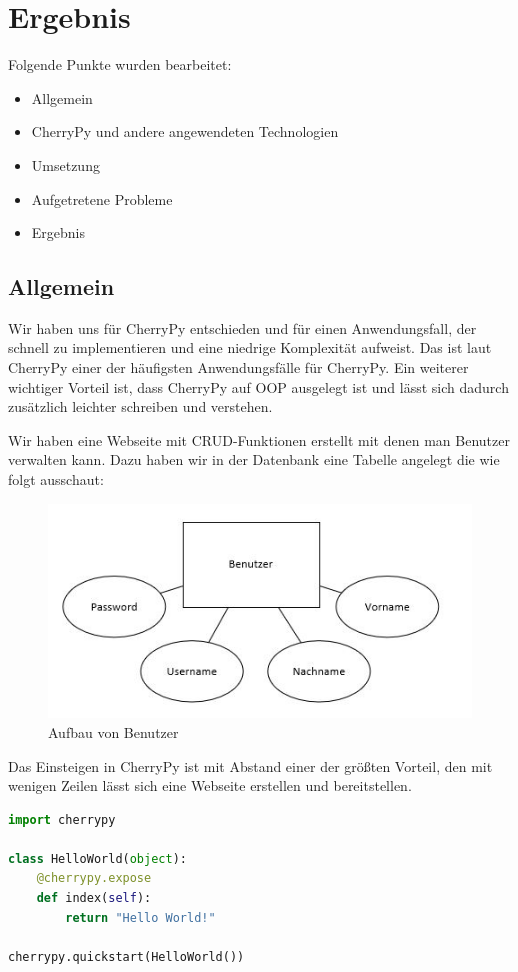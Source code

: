 \section{Ergebnis}
\label{sec:Ergebnis}

Folgende Punkte wurden bearbeitet:

\begin{itemize}
	\item Allgemein
	\item CherryPy und andere angewendeten Technologien
	\item Umsetzung
	\item Aufgetretene Probleme	
	\item Ergebnis
\end{itemize}


\subsection{Allgemein}

Wir haben uns für CherryPy entschieden und für einen Anwendungsfall, der schnell zu implementieren und eine niedrige Komplexität aufweist. Das ist laut CherryPy einer der häufigsten Anwendungsfälle für CherryPy. Ein weiterer wichtiger Vorteil ist, dass CherryPy auf OOP ausgelegt ist und lässt sich dadurch zusätzlich leichter schreiben und verstehen.

Wir haben eine Webseite mit CRUD-Funktionen erstellt mit denen man Benutzer verwalten kann. 
Dazu haben wir in der Datenbank eine Tabelle angelegt die wie folgt ausschaut:

\begin{figure}[H]
	\centering
	\includegraphics[width=0.5\linewidth]{images/db}
	\caption{Aufbau von Benutzer}
	\label{fig:Benutzeraufbau}
\end{figure}


Das Einsteigen in CherryPy ist mit Abstand einer der größten Vorteil, den mit wenigen Zeilen lässt sich eine Webseite erstellen und bereitstellen.
\begin{lstlisting}[language=Python]
import cherrypy

class HelloWorld(object):
	@cherrypy.expose
	def index(self):
		return "Hello World!"

cherrypy.quickstart(HelloWorld())
\end{lstlisting}

